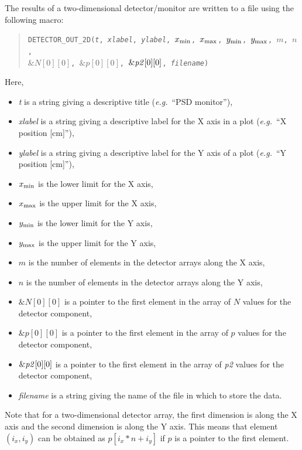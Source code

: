 {The results of a two-dimensional detector/\discretionary{}{}{}mon\-i\-tor are written to a file using the
following macro:
\begin{quote}
  \texttt{DETECTOR\_OUT\_2D({\it t},
        {\it xlabel},
        {\it ylabel},
        $x_{\rm min}$, $x_{\rm max}$, $y_{\rm min}$, $y_{\rm max}$, $m$, $n$,\\
          $\&N[0][0]$, $\&p[0][0]$, $\&{\it p2}[0][0]$,
        {\it filename})}
\end{quote}
Here,
\begin{itemize}
\item \textit{t} is a string giving a descriptive title ({\em e.g.}\ ``PSD
  monitor''),
\item \textit{xlabel} is a string giving a descriptive label for the X
  axis in a plot ({\em e.g.}\ ``X position [cm]''),
\item \textit{ylabel} is a string giving a descriptive label for the Y
  axis of a plot ({\em e.g.}\ ``Y position [cm]''),
\item $x_{\rm min}$ is the lower limit for the X axis,
\item $x_{\rm max}$ is the upper limit for the X axis,
\item $y_{\rm min}$ is the lower limit for the Y axis,
\item $y_{\rm max}$ is the upper limit for the Y axis,
\item $m$ is the number of elements in the detector arrays along the X axis,
\item $n$ is the number of elements in the detector arrays along the Y axis,
\item $\&N[0][0]$ is a pointer to the first element in the array of $N$
  values for the detector component,
\item $\&p[0][0]$ is a pointer to the first element in the array of $p$
  values for the detector component,
\item $\&{\it p2}[0][0]$ is a pointer to the first element in the array of
  {\it p2} values for the detector component,
\item \textit{filename} is a string giving the name of the file in which
  to store the data.
\end{itemize}
Note that for a two-dimensional detector array, the first dimension is
along the X axis and the second dimension is along the Y axis. This
means that element $(i_x,i_y)$ can be obtained as $p[i_x*n+i_y]$ if $p$
is a pointer to the first element.

}

